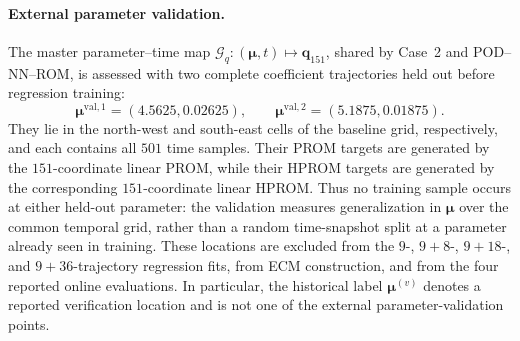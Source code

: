 \documentclass[11pt]{article}
\newcommand{\q}{\mathbf q}
\begin{document}
\paragraph{External parameter validation.}
The master parameter--time map
\(\mathcal G_q:(\bm\mu,t)\mapsto\q_{151}\), shared by Case~2 and
POD--NN--ROM, is assessed with two complete coefficient trajectories held out
before regression training:
\begin{equation}
\bm\mu^{\mathrm{val},1}=(4.5625,0.02625),\qquad
\bm\mu^{\mathrm{val},2}=(5.1875,0.01875).
\label{eq:external-parameter-validation}
\end{equation}
They lie in the north-west and south-east cells of the baseline grid,
respectively, and each contains all $501$ time samples.  Their PROM targets
are generated by the $151$-coordinate linear PROM, while their HPROM targets
are generated by the corresponding $151$-coordinate linear HPROM.  Thus no
training sample occurs at either held-out parameter: the validation measures
generalization in \(\bm\mu\) over the common temporal grid, rather than a
random time-snapshot split at a parameter already seen in training.  These
locations are excluded from the $9$-, $9+8$-, $9+18$-, and $9+36$-trajectory regression
fits, from ECM construction, and from the four reported online evaluations.  In
particular, the historical label \(\bm\mu^{(v)}\) denotes a reported
verification location and is not one of the external parameter-validation
points.
\end{document}
